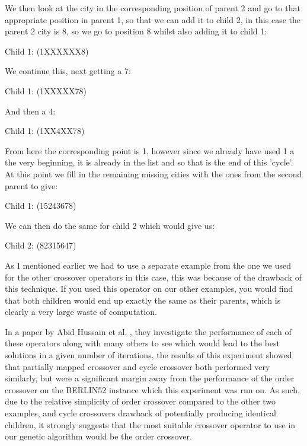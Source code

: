 \documentclass[11pt,a4paper,titlepage]{article}
\begin{document}
We then look at the city in the corresponding position of parent 2 and go to that appropriate position in parent 1, so that we can add it to child 2, in this case the parent 2 city is 8, so we go to position 8 whilst also adding it to child 1:

\begin{center}\Large
Child 1: (1XXXXXX8)\\
\end{center}

We continue this, next getting a 7:

\begin{center}\Large
Child 1: (1XXXXX78)\\
\end{center}

And then a 4:

\begin{center}\Large
Child 1: (1XX4XX78)\\
\end{center}

From here the corresponding point is 1, however since we already have used 1 a the very beginning, it is already in the list and so that is the end of this 'cycle'. At this point we fill in the remaining missing cities with the ones from the second parent to give:

 \begin{center}\Large
Child 1: (15243678)\\
\end{center}

We can then do the same for child 2 which would give us:

\begin{center}\Large
Child 2: (82315647)\\
\end{center}

As I mentioned earlier we had to use a separate example from the one we used for the other crossover operators in this case, this was because of the drawback of this technique. If you used this operator on our other examples, you would find that both children would end up exactly the same as their parents, which is clearly a very large waste of computation.

In a paper by Abid Hussain et al. \cite{GACrossoverPerformance}, they investigate the performance of each of these operators along with many others to see which would lead to the best solutions in a given number of iterations, the results of this experiment showed that partially mapped crossover and cycle crossover both performed very similarly, but were a significant margin away from the performance of the order crossover on the BERLIN52 instance which this experiment was run on. As such, due to the relative simplicity of order crossover compared to the other two examples, and cycle crossovers drawback of potentially producing identical children, it strongly suggests that the most suitable crossover operator to use in our genetic algorithm would be the order crossover.
\end{document}

